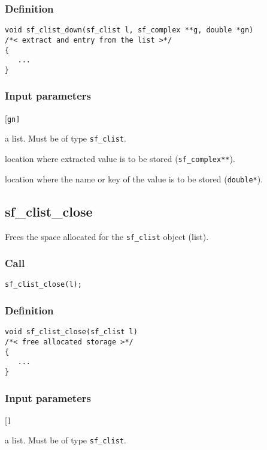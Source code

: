 \subsubsection*{Definition}
\begin{verbatim}
void sf_clist_down(sf_clist l, sf_complex **g, double *gn)
/*< extract and entry from the list >*/
{
   ...
}
\end{verbatim}

\subsubsection*{Input parameters}
\begin{desclist}{\tt }{\quad}[\tt gn]
   \setlength\itemsep{0pt}
   \item[l]  a list. Must be of type \texttt{sf\_clist}. 
   \item[g]  location where extracted value is to be stored (\texttt{sf\_complex**}). 
   \item[gn] location where the name or key of the value is to be stored (\texttt{double*}).  
\end{desclist}




\subsection{{sf\_clist\_close}}
Frees the space allocated for the \texttt{sf\_clist} object (list).

\subsubsection*{Call}
\begin{verbatim}sf_clist_close(l);\end{verbatim}

\subsubsection*{Definition}
\begin{verbatim}
void sf_clist_close(sf_clist l) 
/*< free allocated storage >*/
{
   ...
}
\end{verbatim}

\subsubsection*{Input parameters}
\begin{desclist}{\tt }{\quad}[\tt ]
   \setlength\itemsep{0pt}
   \item[l] a list. Must be of type \texttt{sf\_clist}.  
\end{desclist}




